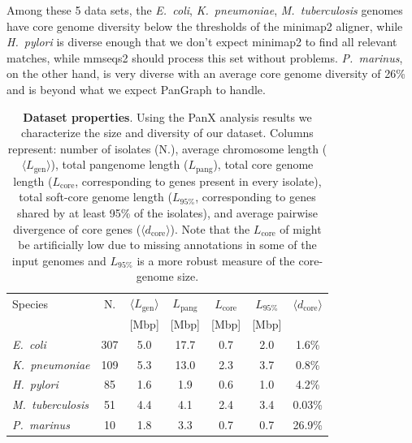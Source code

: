 \documentclass[aps,rmp,preprint,superscriptaddress,10pt,linenumbers]{revtex4-1}
\newcommand{\avg}[1]{\langle #1 \rangle}
\newcommand{\Lcore}{L_\text{core}}
\newcommand{\Lsoftcore}{L_\text{95\%}}
\newcommand{\Lpang}{L_\text{pang}}
\newcommand{\Lgen}{L_\text{gen}}
\newcommand{\dcore}{\langle d_\text{core} \rangle}
\begin{document}
Among these 5 data sets, the \textit{E.~coli}, \textit{K.~pneumoniae}, \textit{M.~tuberculosis} genomes have core genome diversity below the thresholds of the minimap2 aligner, while \textit{H.~pylori} is diverse enough that we don't expect minimap2 to find all relevant matches, while mmseqs2 should process this set without problems.
\textit{P.~marinus}, on the other hand, is very diverse with an average core genome diversity of 26\% and is beyond what we expect PanGraph to handle.


\begin{table}[h]
    \setlength{\tabcolsep}{6pt}
    \begin{tabular}{l c c c c c c}
        \hline\hline
        Species                  & N.  & $\avg{\Lgen}$ & $\Lpang$ & $\Lcore$ & $\Lsoftcore$ & $\dcore$ \\
                                 &     & [Mbp]         & [Mbp]    & [Mbp]    & [Mbp]        &          \\
        \hline
        \textit{E.~coli}         & 307 & 5.0           & 17.7     & 0.7      & 2.0          & 1.6\%    \\
        \textit{K.~pneumoniae}   & 109 & 5.3           & 13.0     & 2.3      & 3.7          & 0.8\%    \\
        \textit{H.~pylori}       & 85  & 1.6           & 1.9      & 0.6      & 1.0          & 4.2\%    \\
        \textit{M.~tuberculosis} & 51  & 4.4           & 4.1      & 2.4      & 3.4          & 0.03\%   \\
        \textit{P.~marinus}      & 10  & 1.8           & 3.3      & 0.7      & 0.7          & 26.9\%   \\
        \hline
    \end{tabular}
    \caption{{\bf Dataset properties}. Using the PanX analysis results we characterize the size and diversity of our dataset. Columns represent:
        number of isolates (N.),
        average chromosome length ($\avg{\Lgen}$),
        total pangenome length ($\Lpang$),
        total core genome length ($\Lcore$, corresponding to genes present in every isolate),
        total soft-core genome length ($\Lsoftcore$, corresponding to genes shared by at least 95\% of the isolates),
        and average pairwise divergence of core genes ($\dcore$). Note that the $\Lcore$ of might be artificially low due to missing annotations in some of the input genomes and $\Lsoftcore$ is a more robust measure of the core-genome size.
    }
    \label{table:panx-dataset}
\end{table}
\end{document}
